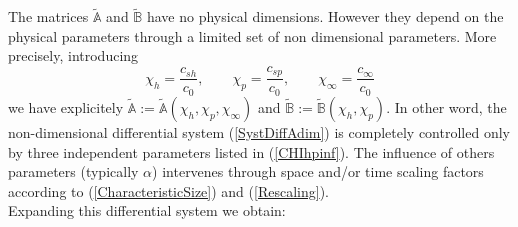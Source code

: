 \documentclass[
10pt, %
a4paper, %
oneside, %
headinclude,footinclude, %
table
]{scrartcl}
\begin{document}
The matrices $\tilde{\mathbb{A}}$ and $\tilde{\mathbb{B}}$ have no physical dimensions. However they depend on the physical parameters through a limited set of non dimensional parameters. More precisely, introducing
\begin{equation}\label{CHIhpinf}
\chi_{h}=\frac{c_{sh}}{c_{0}}, \quad\quad
\chi_{p}=\frac{c_{sp}}{c_{0}}, \quad\quad
\chi_{\infty}=\frac{c_{\infty}}{c_{0}}
\end{equation}
we have explicitely $\tilde{\mathbb{A}}:=\tilde{\mathbb{A}}(\chi_{h},\chi_{p},\chi_{\infty})$ and $\tilde{\mathbb{B}}:=\tilde{\mathbb{B}}(\chi_{h},\chi_{p})$. In other word, the non-dimensional differential system (\ref{SystDiffAdim}) is completely controlled only by three independent parameters listed in (\ref{CHIhpinf}). The influence of others parameters (typically $\alpha$) intervenes through space and/or time scaling factors according to (\ref{CharacteristicSize}) and (\ref{Rescaling}). \\
Expanding this differential system we obtain:
\end{document}
